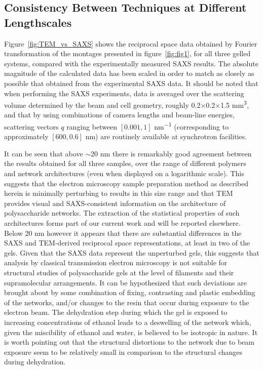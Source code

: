 \subsection{Consistency Between Techniques at Different Lengthscales}

Figure~\ref{fig:TEM_vs_SAXS} shows the reciprocal space data obtained by Fourier transformation of the montages presented in figure~\ref{fig:fig1}, for all three gelled systems, compared with the experimentally measured SAXS results. The absolute magnitude of the calculated data has been scaled in order to match as closely as possible that obtained from the experimental SAXS data. It should be noted that when performing the SAXS experiments, data is averaged over the scattering volume determined by the beam and cell geometry, roughly 0.2$\times$0.2$\times$1.5 \si{\mm^3}, and that by using combinations of camera lengths and beam-line energies, scattering vectors $q$ ranging between $[0.001, 1]$ \si{\nm^{-1}} (corresponding to approximately $[ 600, 0.6]$ \si{nm}) are routinely available at synchrotron facilities.


It can be seen that above $\sim$20 nm there is remarkably good agreement between the results obtained for all three samples, over the range of different polymers and network architectures (even when displayed on a logarithmic scale). This suggests that the electron microscopy sample preparation method as described herein is minimally perturbing to results in this size range and that TEM provides visual and SAXS-consistent information on the architecture of polysaccharide networks. The extraction of the statistical properties of such architectures forms part of our current work and will be reported elsewhere. Below 20 nm however it appears that there are substantial differences in the SAXS and TEM-derived reciprocal space representations, at least in two of the gels. Given that the SAXS data represent the unperturbed gels, this suggests that analysis by classical transmission electron microscopy is not suitable for structural studies of polysaccharide gels at the level of filaments and their supramolecular arrangements. It can be hypothesized that such deviations are brought about by some combination of fixing, contrasting and plastic embedding of the networks, and/or changes to the resin that occur during exposure to the electron beam. The dehydration step during which the gel is exposed to increasing concentrations of ethanol leads to a deswelling of the network which, given the miscibility of ethanol and water, is believed to be isotropic in nature. It is worth pointing out that the structural distortions to the network due to beam exposure seem to be relatively small in comparison to the structural changes during dehydration. 

